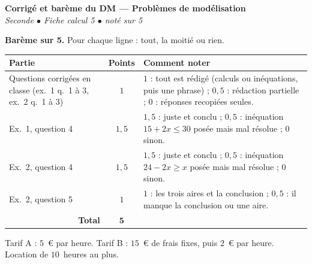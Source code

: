 \documentclass[11pt,a4paper]{article}
\newcommand{\exercice}[1]{%
  \vspace{0.5em}
  \noindent\exobox{Exercice #1}\par
  \vspace{0.6em}
}
\begin{document}
\begin{center}
  {\Large\bfseries Corrigé et barème du DM --- Problèmes de modélisation}\\[0.4em]
  {\itshape Seconde \quad $\bullet$ \quad Fiche calcul 5 \quad $\bullet$ \quad noté sur 5}
\end{center}

\vspace{0.6em}
\begin{tcolorbox}[colback=bandeau, colframe=bandeau, boxrule=0pt, arc=0pt, left=6pt, right=6pt]
\textbf{Barème sur 5.} Pour chaque ligne : tout, la moitié ou rien.

\smallskip
\renewcommand{\arraystretch}{1.3}
\begin{tabular}{|p{6.3cm}|c|p{8.6cm}|}
  \hline
  \textbf{Partie} & \textbf{Points} & \textbf{Comment noter} \\ \hline
  Questions corrigées en classe (ex.~1 q.~1 à 3, ex.~2 q.~1 à 3) & $1$ & $1$ : tout est rédigé (calculs ou inéquations, puis une phrase) ; $0{,}5$ : rédaction partielle ; $0$ : réponses recopiées seules. \\ \hline
  Ex.~1, question 4 & $1{,}5$ & $1{,}5$ : juste et conclu ; $0{,}5$ : inéquation $15+2x\leqslant 30$ posée mais mal résolue ; $0$ sinon. \\ \hline
  Ex.~2, question 4 & $1{,}5$ & $1{,}5$ : juste et conclu ; $0{,}5$ : inéquation $24-2x\geqslant x$ posée mais mal résolue ; $0$ sinon. \\ \hline
  Ex.~2, question 5 & $1$ & $1$ : les trois aires et la conclusion ; $0{,}5$ : il manque la conclusion ou une aire. \\ \hline
  \multicolumn{1}{|r|}{\textbf{Total}} & $\mathbf{5}$ & \\ \hline
\end{tabular}
\end{tcolorbox}

\exercice{1}
Tarif A : $5$~€ par heure. Tarif B : $15$~€ de frais fixes, puis $2$~€ par heure. Location de $10$~heures au plus.
\end{document}
